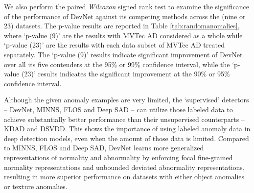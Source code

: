\documentclass[10pt,journal,compsoc]{IEEEtran}
\begin{document}
We also perform the paired \textit{Wilcoxon} signed rank test \cite{woolson2007wilcoxon} to examine the significance of the performance of DevNet against its competing methods across the (nine or 23) datasets. The p-value results are reported in Table \ref{tab:randomanomalies}, where `p-value (9)' are the results with MVTec AD considered as a whole while `p-value (23)' are the results with each data subset of MVTec AD treated separately. The `p-value (9)' results indicate significant improvement of DevNet over all its five contenders at the 95\% or 99\% confidence interval, while the `p-value (23)' results indicates the significant improvement at the 90\% or 95\% confidence interval.

Although the given anomaly examples are very limited, the `supervised' detectors -- DevNet, MINNS, FLOS and Deep SAD -- can utilize those labeled data to achieve substantially better performance than their unsupervised counterparts -- KDAD and DSVDD. This shows the importance of using labeled anomaly data in deep detection models, even when the amount of those data is limited. Compared to MINNS, FLOS and Deep SAD, DevNet learns more generalized representations of normality and abnormality by enforcing focal fine-grained normality representations and unbounded deviated abnormality representations, resulting in more superior performance on datasets with either object anomalies or texture anomalies. 
\end{document}
